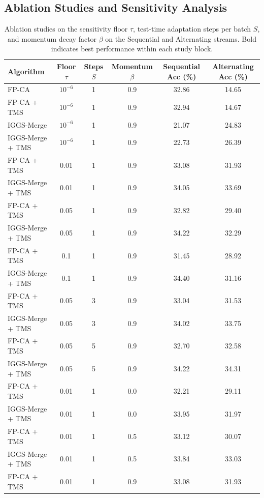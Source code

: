 \documentclass{article}
\theoremstyle{plain}
\theoremstyle{definition}
\theoremstyle{remark}
\begin{document}
\subsection{Ablation Studies and Sensitivity Analysis}
\begin{table}[t]
\caption{Ablation studies on the sensitivity floor $\tau$, test-time adaptation steps per batch $S$, and momentum decay factor $\beta$ on the Sequential and Alternating streams. Bold indicates best performance within each study block.}
\label{tab:ablation_results}
\vskip 0.15in
\begin{center}
\begin{small}
\begin{sc}
\begin{tabular}{lccccc}
\toprule
Algorithm & Floor $\tau$ & Steps $S$ & Momentum $\beta$ & Sequential Acc (\%) & Alternating Acc (\%) \\
\midrule
FP-CA & $10^{-6}$ & 1 & 0.9 & 32.86 & 14.65 \\
FP-CA + TMS & $10^{-6}$ & 1 & 0.9 & 32.94 & 14.67 \\
IGGS-Merge & $10^{-6}$ & 1 & 0.9 & 21.07 & 24.83 \\
IGGS-Merge + TMS & $10^{-6}$ & 1 & 0.9 & 22.73 & 26.39 \\
\midrule
FP-CA + TMS & 0.01 & 1 & 0.9 & 33.08 & 31.93 \\
IGGS-Merge + TMS & 0.01 & 1 & 0.9 & 34.05 & 33.69 \\
FP-CA + TMS & 0.05 & 1 & 0.9 & 32.82 & 29.40 \\
IGGS-Merge + TMS & 0.05 & 1 & 0.9 & 34.22 & 32.29 \\
FP-CA + TMS & 0.1 & 1 & 0.9 & 31.45 & 28.92 \\
IGGS-Merge + TMS & 0.1 & 1 & 0.9 & 34.40 & 31.16 \\
\midrule
FP-CA + TMS & 0.05 & 3 & 0.9 & 33.04 & 31.53 \\
IGGS-Merge + TMS & 0.05 & 3 & 0.9 & 34.02 & 33.75 \\
FP-CA + TMS & 0.05 & 5 & 0.9 & 32.70 & 32.58 \\
IGGS-Merge + TMS & 0.05 & 5 & 0.9 & 34.22 & 34.31 \\
\midrule
FP-CA + TMS & 0.01 & 1 & 0.0 & 32.21 & 29.11 \\
IGGS-Merge + TMS & 0.01 & 1 & 0.0 & 33.95 & 31.97 \\
FP-CA + TMS & 0.01 & 1 & 0.5 & 33.12 & 30.07 \\
IGGS-Merge + TMS & 0.01 & 1 & 0.5 & 33.84 & 33.03 \\
FP-CA + TMS & 0.01 & 1 & 0.9 & 33.08 & 31.93 \\

\end{tabular}
\end{sc}
\end{small}
\end{center}
\end{table}
\end{document}
